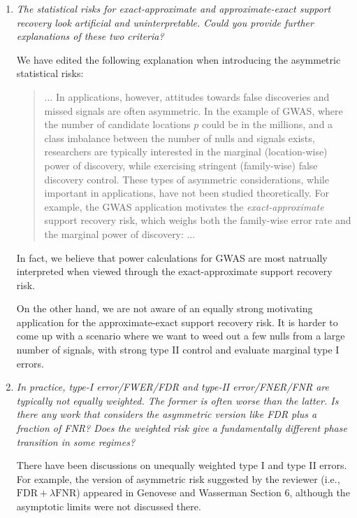 \documentclass[11pt]{article}
\begin{document}
\begin{enumerate}
    \item {\em The statistical risks for exact-approximate and approximate-exact support recovery look artificial and uninterpretable. 
    Could you provide further explanations of these two criteria?} 
    
    We have edited the following explanation when introducing the asymmetric statistical risks:
    \begin{quote}
    $\dots$
	In applications, however, attitudes towards false discoveries and missed signals are often asymmetric.
	In the example of GWAS, where the number of candidate locations $p$ could be in the millions, and a class imbalance between the number of nulls and signals exists, researchers are typically interested in the marginal (location-wise) power of discovery, while exercising stringent (family-wise) false discovery control. 
	These types of asymmetric considerations, while important in applications, have not been studied theoretically.  
	For example, the GWAS application motivates the \emph{exact-approximate} support recovery risk, which weighs both the family-wise error rate and the marginal power of discovery:
	$\dots$
    \end{quote}
    In fact, we believe that power calculations for GWAS are most natrually interpreted when viewed through the exact-approximate support recovery risk.
    
    On the other hand, we are not aware of an equally strong motivating application for the approximate-exact support recovery risk. 
    It is harder to come up with a scenario where we want to weed out a few nulls from a large number of signals, with strong type II control and evaluate marginal type I errors. 
        
    \item {\em In practice, type-I error/FWER/FDR and type-II error/FNER/FNR are typically not equally weighted. The former is often worse than the latter. Is there any work that considers the asymmetric version like FDR plus a fraction of FNR? Does the weighted risk give a fundamentally different phase transition in some regimes?}
    
    There have been discussions on unequally weighted type I and type II errors. For example, the version of asymmetric risk suggested by the reviewer (i.e., $\textrm{FDR} + \lambda\textrm{FNR}$) appeared in Genovese and Wasserman \citep{genovese2002operating} Section 6, although the asymptotic limits were not discussed there.
    

\end{enumerate}
\end{document}
